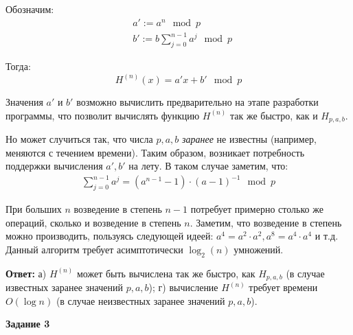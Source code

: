 \documentclass[12pt, a4paper]{extarticle}
\newenvironment*{dummyenv}{}{}
\newcommand{\mysection}[1]{
    \addcontentsline{toc}{section}{#1}
    \begin{dummyenv}
        \bfseries\large #1
    \end{dummyenv}
}
\begin{document}
Обозначим:
\begin{equation*}
    \begin{split}
        & a' := a^n \mod p \\
        & b' := b \sum_{j=0}^{n - 1} a^j \mod p
    \end{split}
\end{equation*}

Тогда:
\begin{equation*}
    H^{(n)}(x) = a'x + b' \mod p
\end{equation*}

Значения $a'$ и $b'$ возможно вычислить предварительно на этапе разработки программы, что позволит 
вычислять функцию $H^{(n)}$ так же быстро, как и $H_{p,a,b}$.

Но может случиться так, что числа $p,a,b$ \textit{заранее} не известны (например, меняются с 
течением времени). Таким образом, возникает потребность поддержки вычисления $a', b'$ на лету. В 
таком случае заметим, что:
\begin{equation*}
    \begin{split}
        \sum_{j=0}^{n-1}a^j = (a^{n-1} - 1) \cdot (a - 1)^{-1} \mod p
    \end{split}
\end{equation*}

При больших $n$ возведение в степень $n-1$ потребует примерно столько же операций, сколько и 
возведение в степень $n$. Заметим, что возведение в степень можно производить, пользуясь следующей 
идеей: $a^4 = a^2 \cdot a^2, a^8 = a^4 \cdot a^4$ и т.д. Данный алгоритм требует асимптотически 
$\log _2(n)$ умножений.

\textbf{Ответ:} а) $H^{(n)}$ может быть вычислена так же быстро, как $H_{p,a,b}$ (в случае известных 
заранее значений $p,a,b$); г) вычисление $H^{(n)}$ требует времени $O(\log n)$ (в случае неизвестных 
заранее значений $p,a,b$).
\\

\mysection{Задание 3}
\end{document}
